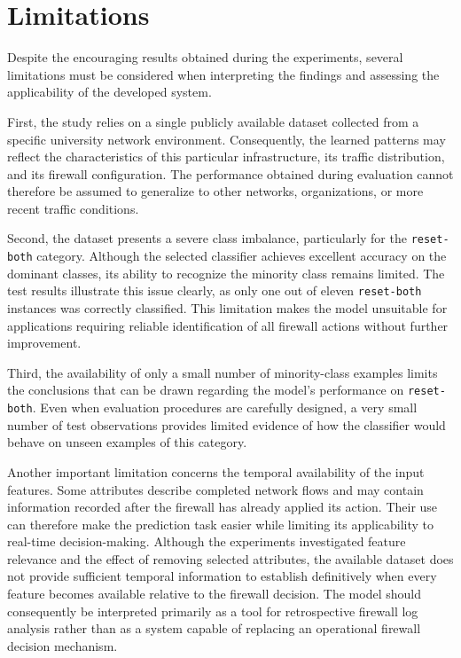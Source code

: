 \section*{Limitations}
Despite the encouraging results obtained during the experiments, several limitations must be considered when interpreting the findings and assessing the applicability of the developed system.

First, the study relies on a single publicly available dataset collected from a specific university network environment. Consequently, the learned patterns may reflect the characteristics of this particular infrastructure, its traffic distribution, and its firewall configuration. The performance obtained during evaluation cannot therefore be assumed to generalize to other networks, organizations, or more recent traffic conditions.

Second, the dataset presents a severe class imbalance, particularly for the \texttt{reset-both} category. Although the selected classifier achieves excellent accuracy on the dominant classes, its ability to recognize the minority class remains limited. The test results illustrate this issue clearly, as only one out of eleven \texttt{reset-both} instances was correctly classified. This limitation makes the model unsuitable for applications requiring reliable identification of all firewall actions without further improvement.

Third, the availability of only a small number of minority-class examples limits the conclusions that can be drawn regarding the model's performance on \texttt{reset-both}. Even when evaluation procedures are carefully designed, a very small number of test observations provides limited evidence of how the classifier would behave on unseen examples of this category.

Another important limitation concerns the temporal availability of the input features. Some attributes describe completed network flows and may contain information recorded after the firewall has already applied its action. Their use can therefore make the prediction task easier while limiting its applicability to real-time decision-making. Although the experiments investigated feature relevance and the effect of removing selected attributes, the available dataset does not provide sufficient temporal information to establish definitively when every feature becomes available relative to the firewall decision. The model should consequently be interpreted primarily as a tool for retrospective firewall log analysis rather than as a system capable of replacing an operational firewall decision mechanism.

